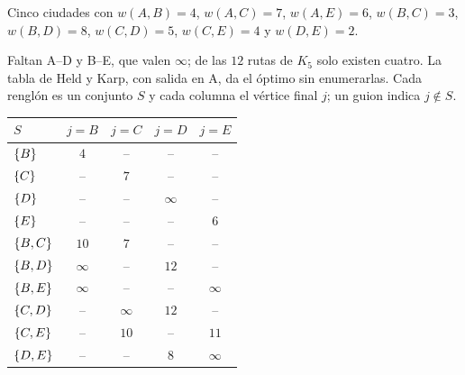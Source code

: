 \documentclass[11pt,letterpaper]{article}
\begin{document}
\begin{ejemplo}
  \label{ej:hamilton-tsp}
  Cinco ciudades con $w(A,B) = 4$, $w(A,C) = 7$, $w(A,E) = 6$,
  $w(B,C) = 3$, $w(B,D) = 8$, $w(C,D) = 5$, $w(C,E) = 4$ y
  $w(D,E) = 2$.
  \begin{center}
  \end{center}
  Faltan A--D y B--E, que valen $\infty$; de las $12$ rutas de $K_5$
  solo existen cuatro. La tabla de Held y Karp, con salida en A, da el
  óptimo sin enumerarlas. Cada renglón es un conjunto $S$ y cada
  columna el vértice final $j$; un guion indica $j \notin S$.
  \begin{center}
  \small
  \begin{tabular}[t]{lcccc}
    \toprule
    $S$ & $j = B$ & $j = C$ & $j = D$ & $j = E$ \\
    \midrule
    $\left\{ B \right\}$ & $4$ & -- & -- & -- \\
    $\left\{ C \right\}$ & -- & $7$ & -- & -- \\
    $\left\{ D \right\}$ & -- & -- & $\infty$ & -- \\
    $\left\{ E \right\}$ & -- & -- & -- & $6$ \\
    \addlinespace
    $\left\{ B, C \right\}$ & $10$ & $7$ & -- & -- \\
    $\left\{ B, D \right\}$ & $\infty$ & -- & $12$ & -- \\
    $\left\{ B, E \right\}$ & $\infty$ & -- & -- & $\infty$ \\
    $\left\{ C, D \right\}$ & -- & $\infty$ & $12$ & -- \\
    $\left\{ C, E \right\}$ & -- & $10$ & -- & $11$ \\
    $\left\{ D, E \right\}$ & -- & -- & $8$ & $\infty$ \\
    \bottomrule
  \end{tabular}

\end{center}
\end{ejemplo}
\end{document}

